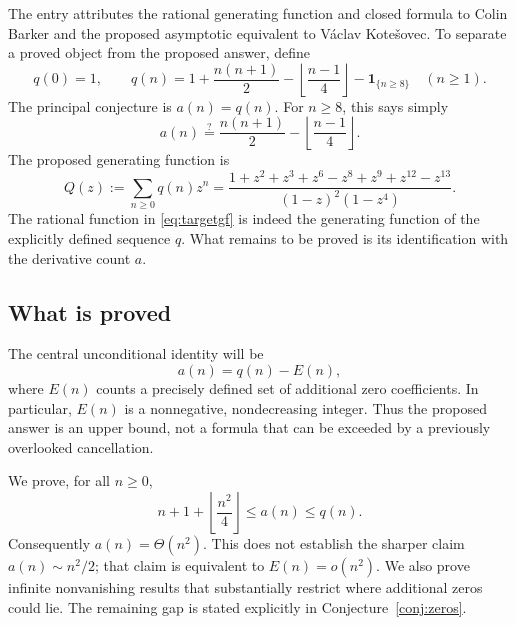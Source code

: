\documentclass[11pt,a4paper]{article}
\numberwithin{equation}{section}
\theoremstyle{definition}
\theoremstyle{remark}
\newcommand{\ind}[1]{\mathbf{1}_{\{#1\}}}
\begin{document}
The entry attributes the rational generating function and closed formula to
Colin Barker and the proposed asymptotic equivalent to V\'aclav
Kote\v{s}ovec. To separate a proved object from the proposed answer, define
\begin{equation}\label{eq:q}
 q(0)=1,\qquad
 q(n)=1+\frac{n(n+1)}2-\left\lfloor\frac{n-1}{4}\right\rfloor
             -\ind{n\ge8}\quad(n\ge1).
\end{equation}
The principal conjecture is $a(n)=q(n)$. For $n\ge8$, this says simply
\begin{equation}\label{eq:eventual}
 a(n)\stackrel{?}{=}\frac{n(n+1)}2-\left\lfloor\frac{n-1}{4}\right\rfloor.
\end{equation}
The proposed generating function is
\begin{equation}\label{eq:targetgf}
 Q(z):=\sum_{n\ge0}q(n)z^n
 =\frac{1+z^2+z^3+z^6-z^8+z^9+z^{12}-z^{13}}
 {(1-z)^2(1-z^4)}.
\end{equation}
The rational function in \eqref{eq:targetgf} is indeed the generating function
of the explicitly defined sequence $q$. What remains to be proved is its
identification with the derivative count $a$.

\subsection{What is proved}
The central unconditional identity will be
\begin{equation}\label{eq:introdefect}
 a(n)=q(n)-E(n),
\end{equation}
where $E(n)$ counts a precisely defined set of additional zero coefficients.
In particular, $E(n)$ is a nonnegative, nondecreasing integer. Thus the
proposed answer is an upper bound, not a formula that can be exceeded by a
previously overlooked cancellation.

We prove, for all $n\ge0$,
\begin{equation}\label{eq:introbounds}
 n+1+\left\lfloor\frac{n^2}{4}\right\rfloor\le a(n)\le q(n).
\end{equation}
Consequently $a(n)=\Theta(n^2)$. This does not establish the sharper claim
$a(n)\sim n^2/2$; that claim is equivalent to $E(n)=o(n^2)$.
We also prove infinite nonvanishing results that substantially restrict where
additional zeros could lie. The remaining gap is stated explicitly in
Conjecture~\ref{conj:zeros}.
\end{document}
